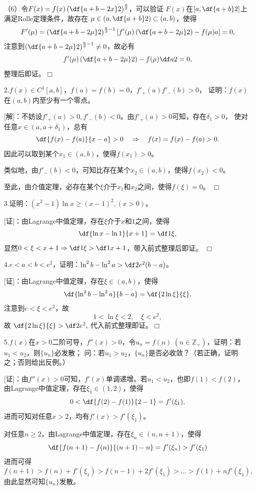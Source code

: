 （6）令$F(x)=f(x)\left(\df{a+b-2x}2\right)^{\frac a2}$，可以验证
$F(x)$在$\left[a,\df{a+b}2\right]$上满足Rolle定理条件，故存在
$\mu\in\left(a,\df{a+b}2\right)\subset(a,b)$，使得
$$F'(\mu)=\left(\df{a+b-2\mu}2\right)^{\frac a2-1}
\left[f'(\mu)\left(\df{a+b-2\mu}2\right)
-f(\mu)a\right]=0,$$
注意到$\left(\df{a+b-2\mu}2\right)^{\frac a2-1}\ne0$，故必有
$$f'(\mu)\left(\df{a+b-2\mu}2\right)-f(\mu)\df a2=0,$$
整理后即证。\hfill$\Box$

\bigskip

2.$f(x)\in C^1[a,b]$，$f(a)=f(b)=0$，$f'_+(a)f'_-(b)>0$，
证明：$f(x)$在$(a,b)$内至少有一个零点。

[解]：不妨设$f'_+(a)>0,f'_-(b)<0$。由$f'_+(a)>0$可知，存在$\delta_1>0$，
使对任意$x\in(a,a+\delta_1)$，总有
$$\df{f(x)-f(a)}{x-a}>0\quad\Rightarrow
\quad f(x)=f(x)-f(a)>0.$$
因此可以取到某个$x_1\in(a,b)$，使得$f(x_1)>0$。

类似地，由$f'_-(b)<0$，可知比存在某个$x_2\in(a,b)$，使得$f(x_2)<0$。

至此，由介值定理，必存在某个$\xi$介于$x_1$和$x_2$之间，使得$f(\xi)=0$。
\hfill$\Box$

\bigskip

3.证明：$(x^2-1)\ln x\geq(x-1)^2,(x>0)$。

[证]：由Lagrange中值定理，存在$\xi$介于$x$和$1$之间，使得
$$\df{\ln x-\ln 1}{x+1}=\df1{\xi},$$
显然$0<\xi<x+1\Rightarrow\df1{\xi}>\df1{x+1}$，带入前式整理后即证。
\hfill$\Box$

\bigskip

4.$e<a<b<e^2$，证明：$\ln^2b-\ln^2a>\df2{e^2}(b-a)$。

[证]：由Lagrange中值定理，存在$\xi\in(a,b)$，使得
$$\df{\ln^2b-\ln^2a}{b-a}=\df{2\ln\xi}{\xi},$$
注意到$e<\xi<e^2$，故
$$1<\ln\xi<2,\quad \xi<e^2,$$
故
$\df{2\ln\xi}{\xi}>\df2{e^2},$
代入前式整理即证。\hfill$\Box$

\bigskip

5.$f(x)$在$x>0$二阶可导，$f''(x)>0$，令$u_n=f(n)\;
 (n\in\mathbb{Z}_+)$，证明：若$u_1<u_2$，则$\{u_n\}$必发散；
问：若$u_1>u_2$，$\{u_n\}$是否必收敛？（若正确，证明之；否则给出反例。）

[证]：由$f''(x)>0$可知，$f'(x)$单调递增。若$u_1<u_2$，也即$f(1)<f(2)$，
由Lagrange中值定理，存在$\xi_1\in(1,2)$，使得
$$0<\df{f(2)-f(1)}{2-1}=f'(\xi_1),$$
进而可知对任意$x>2$，均有$f'(x)>f'(\xi_1)$。

对任意$n\geq2$，由Lagrange中值定理，存在$\xi_n\in(n,n+1)$，使得
$$\df{f(n+1)-f(n)}{(n+1)-n}=f'(\xi_n)>f'(\xi_1)$$
进而可得
$$
f(n+1)>f(n)+f'(\xi_1)>f(n-1)+2f'(\xi_1)>\ldots>f(1)+nf'(\xi_1),
$$
由此显然可知$\{u_n\}$发散。

